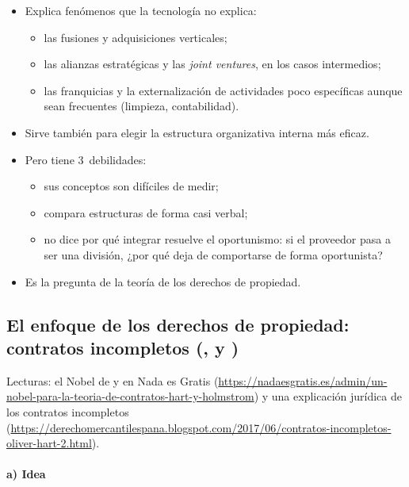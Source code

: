 \documentclass[11pt]{article}
\begin{document}
\begin{itemize}
\item Explica fenómenos que la tecnología no explica:
  \begin{itemize}
  \item las fusiones y adquisiciones verticales;
  \item las alianzas estratégicas y las \emph{joint ventures}, en los casos intermedios;
  \item las franquicias y la externalización de actividades poco específicas aunque sean frecuentes (limpieza, contabilidad).
  \end{itemize}
\item Sirve también para elegir la estructura organizativa interna más eficaz.
\item Pero tiene 3~debilidades:
  \begin{itemize}
  \item sus conceptos son difíciles de medir;
  \item compara estructuras de forma casi verbal;
  \item no dice por qué integrar resuelve el oportunismo: si el proveedor pasa a ser una división, ¿por qué deja de comportarse de forma oportunista?
  \end{itemize}
\item Es la pregunta de la teoría de los derechos de propiedad.
\end{itemize}

\subsection{El enfoque de los derechos de propiedad:\cortetitulo{} contratos incompletos (,  y )}\label{sec:contratos-incompletos}

\begin{anotaciones}
Lecturas: el Nobel de  y  en Nada es Gratis (\url{https://nadaesgratis.es/admin/un-nobel-para-la-teoria-de-contratos-hart-y-holmstrom}) y una explicación jurídica de los contratos incompletos (\url{https://derechomercantilespana.blogspot.com/2017/06/contratos-incompletos-oliver-hart-2.html}).
\end{anotaciones}

\paragraph{a) Idea}
\end{document}
